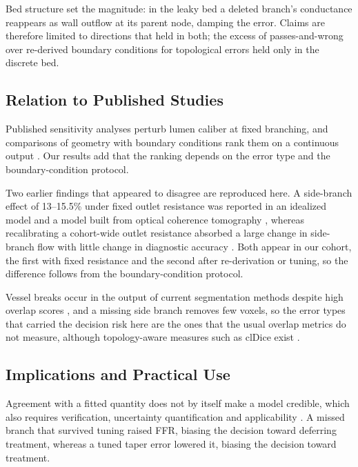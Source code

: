 \documentclass[journal]{IEEEtran}
\begin{document}
Bed structure set the magnitude: in the leaky bed a deleted branch's conductance reappears as wall outflow at its
parent node, damping the error. Claims are therefore limited to directions that held in both; the
excess of passes-and-wrong over re-derived boundary conditions for topological errors held only in the discrete bed.

\subsection{Relation to Published Studies}
Published sensitivity analyses perturb lumen caliber at fixed branching, and comparisons of geometry with boundary
conditions rank them on a continuous output \cite{sankaran2016,tanade2022,korte2023}. Our results add that the
ranking depends on the error type and the boundary-condition protocol.

Two earlier findings that appeared to disagree are reproduced here. A side-branch effect of 13--15.5\% under fixed outlet resistance was reported in an idealized model and a model built from optical coherence tomography \cite{gamage2022}, whereas recalibrating a cohort-wide outlet resistance absorbed a large change in side-branch flow with little change in diagnostic accuracy \cite{gosling2020}. Both appear in our cohort, the first with fixed resistance and the second after re-derivation or tuning, so the difference follows
from the boundary-condition protocol.

Vessel breaks occur in the output of current segmentation methods despite high overlap scores \cite{bransby2026},
and a missing side branch removes few voxels, so the error types that carried the decision risk here are the ones that the usual overlap metrics do not measure, although topology-aware measures such as clDice
exist \cite{shit2021}.

\subsection{Implications and Practical Use}
Agreement with a fitted quantity does not by itself make a model credible, which also requires verification,
uncertainty quantification and applicability \cite{viceconti2025}. A missed branch that survived tuning raised FFR, biasing the decision toward
deferring treatment, whereas a tuned taper error lowered it, biasing the decision toward treatment.
\end{document}
